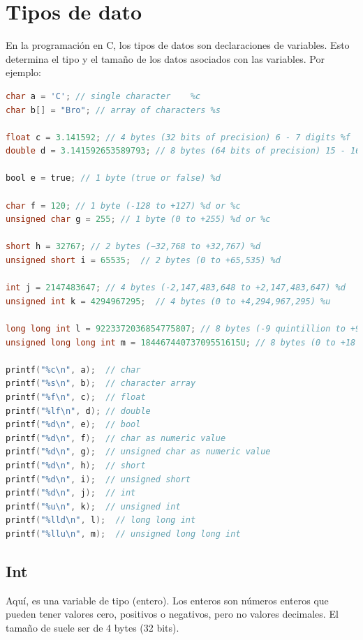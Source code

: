\documentclass{article}
\begin{document}
\section{Tipos de dato}
En la programación en C, los tipos de datos son declaraciones de variables. Esto determina el tipo y el tamaño de los datos asociados con las variables. Por ejemplo:

\begin{lstlisting}[style=mystyle, language=C]
char a = 'C'; // single character    %c
char b[] = "Bro"; // array of characters %s  

float c = 3.141592; // 4 bytes (32 bits of precision) 6 - 7 digits %f
double d = 3.141592653589793; // 8 bytes (64 bits of precision) 15 - 16 digits %lf

bool e = true; // 1 byte (true or false) %d

char f = 120; // 1 byte (-128 to +127) %d or %c
unsigned char g = 255; // 1 byte (0 to +255) %d or %c

short h = 32767; // 2 bytes (−32,768 to +32,767) %d
unsigned short i = 65535;  // 2 bytes (0 to +65,535) %d

int j = 2147483647; // 4 bytes (-2,147,483,648 to +2,147,483,647) %d
unsigned int k = 4294967295;  // 4 bytes (0 to +4,294,967,295) %u

long long int l = 9223372036854775807; // 8 bytes (-9 quintillion to +9 quintillion) %lld
unsigned long long int m = 18446744073709551615U; // 8 bytes (0 to +18 quintillion) %llu

printf("%c\n", a);  // char
printf("%s\n", b);  // character array
printf("%f\n", c);  // float
printf("%lf\n", d); // double
printf("%d\n", e);  // bool
printf("%d\n", f);  // char as numeric value
printf("%d\n", g);  // unsigned char as numeric value
printf("%d\n", h);  // short
printf("%d\n", i);  // unsigned short
printf("%d\n", j);  // int
printf("%u\n", k);  // unsigned int
printf("%lld\n", l);  // long long int
printf("%llu\n", m);  // unsigned long long int
\end{lstlisting}
\subsection{Int}
Aquí, es una variable de tipo (entero). Los enteros son números enteros que pueden tener valores cero, positivos o negativos, pero no valores decimales. El tamaño de suele ser de 4 bytes (32 bits).
\end{document}
